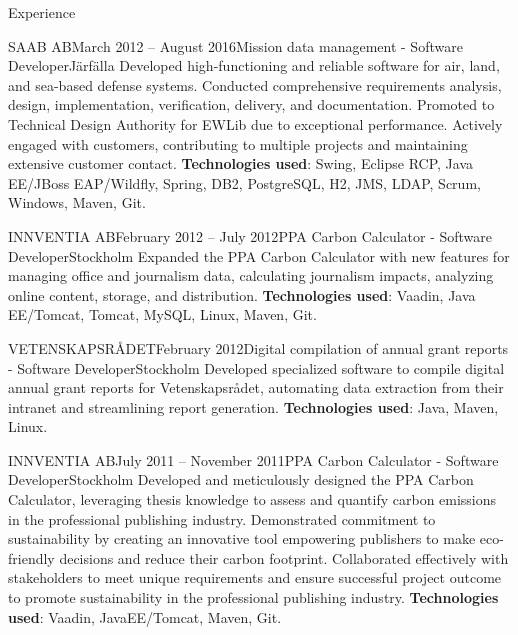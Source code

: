 \documentclass{resume}
\begin{document}
\begin{rSection}{Experience}
    \begin{rSubsection}{SAAB AB}{March 2012 -- August 2016}{Mission data management - Software Developer}{Järfälla}
      \bItem Developed high-functioning and reliable software for air, land, and sea-based defense systems.
      \bItem Conducted comprehensive requirements analysis, design, implementation, verification, delivery, and documentation.
      \bItem Promoted to Technical Design Authority for EWLib due to exceptional performance.
      \bItem Actively engaged with customers, contributing to multiple projects and maintaining extensive customer contact.
      \bItem \textbf{Technologies used}: Swing, Eclipse RCP, Java EE/JBoss EAP/Wildfly, Spring, DB2, PostgreSQL, H2, JMS, LDAP, Scrum, Windows, Maven, Git.
    \end{rSubsection}

    \begin{rSubsection}{INNVENTIA AB}{February 2012 -- July 2012}{PPA Carbon Calculator - Software Developer}{Stockholm}
      \bItem Expanded the PPA Carbon Calculator with new features for managing office and journalism data, calculating journalism impacts, analyzing online content, storage, and distribution.
      \bItem \textbf{Technologies used}: Vaadin, Java EE/Tomcat, Tomcat, MySQL, Linux, Maven, Git.
    \end{rSubsection}

    \begin{rSubsection}{VETENSKAPSRÅDET}{February 2012}{Digital compilation of annual grant reports - Software Developer}{Stockholm}
      \bItem Developed specialized software to compile digital annual grant reports for Vetenskapsrådet, automating data extraction from their intranet and streamlining report generation.
      \bItem \textbf{Technologies used}: Java, Maven, Linux.
    \end{rSubsection}

    \begin{rSubsection}{INNVENTIA AB}{July 2011 -- November 2011}{PPA Carbon Calculator - Software Developer}{Stockholm}
      \bItem Developed and meticulously designed the PPA Carbon Calculator, leveraging thesis knowledge to assess and quantify carbon emissions in the professional publishing industry.
      \bItem Demonstrated commitment to sustainability by creating an innovative tool empowering publishers to make eco-friendly decisions and reduce their carbon footprint.
      \bItem Collaborated effectively with stakeholders to meet unique requirements and ensure successful project outcome to promote sustainability in the professional publishing industry.
      \bItem \textbf{Technologies used}: Vaadin, JavaEE/Tomcat, Maven, Git.
    \end{rSubsection}
  \end{rSection}
\end{document}
